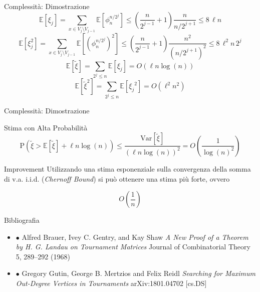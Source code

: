 \documentclass{beamer}
\begin{document}
\begin{frame}{Complessità: Dimostrazione}
	\begin{equation*}
		\mathbb{E}\left[\xi_j\right] = \sum_{x \in V_j \setminus V_{j-1}} \mathbb{E}\left[\phi_{n}^{n/{2^j}}\right] \leq \left(\frac{n}{2^{j-1}}+1\right) \frac{n}{{n}/{2^{j+1}}} \leq 8 \, \ell n
	\end{equation*}
	\vspace{2mm}
	\pause
	\begin{equation*}
		\mathbb{E}\left[\xi_j^2\right] = \sum_{x \in V_j \setminus V_{j-1}} \mathbb{E}\left[\left(\phi_{n}^{n/{2^j}}\right)^2\right] \leq \left(\frac{n}{2^{j-1}}+1\right) \frac{n^2}{\left({n}/{2^{j+1}}\right)^2} \leq 8 \, \ell^2 n \, 2^j
	\end{equation*}
	\vspace{2mm}
	\pause
	\begin{equation*}
		\mathbb{E}\left[\tilde\xi\right] = \sum_{2^j \leq n} \mathbb{E}\left[\xi_j\right] = O\left(\ell n \log\left(n\right)\right)
	\end{equation*}
	\vspace{2mm}
	\begin{equation*}
		\mathbb{E}\left[{\tilde\xi}^2\right] = \sum_{2^j \leq n} \mathbb{E}\left[{\xi_j}^2\right] = O\left(\ell^2 n^2\right)
	\end{equation*}
\end{frame}

\begin{frame}{Complessità: Dimostrazione}
	\begin{block}{Stima con Alta Probabilità}
		\begin{equation*}
			\mathrm{P} \left(\tilde\xi > \mathbb{E}\left[\tilde\xi\right] + \ell n \log(n)\right) \leq \frac{\mathrm{Var}\left[\tilde\xi\right]}{\left(\ell n \log(n)\right)^2} = O\left(\frac{1}{{\log(n)}^2}\right)
		\end{equation*}
	\end{block}
	\begin{block}{Improvement}
		Utilizzando una stima esponenziale sulla convergenza della somma di v.a. i.i.d. (\textit{Chernoff Bound}) si può ottenere una stima più forte, ovvero

		$$ O\left(\frac{1}{n}\right) $$

	\end{block}
\end{frame}

\begin{frame}{Bibliografia}
	\begin{itemize}
		\item $\bullet$ Alfred Brauer, Ivey C. Gentry, and Kay Shaw \textit{A New Proof of a Theorem by H. G. Landau on
			Tournament Matrices} Journal of Combinatorial Theory 5, 289--292 (1968)
		\vspace{4mm}
		\item $\bullet$ Gregory Gutin, George B. Mertzios and Felix Reidl \textit{Searching for Maximum Out-Degree
			Vertices in Tournaments} arXiv:1801.04702 [cs.DS]

	\end{itemize}

\end{frame}
\end{document}
